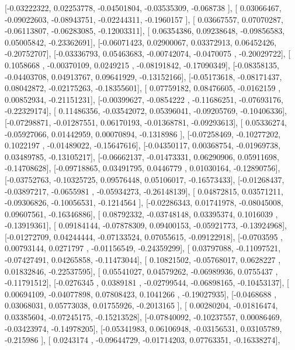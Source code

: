 \documentclass{article}
\begin{document}
       [-0.03222322,  0.02253778, -0.04501804, -0.03535309, -0.068738  ],
       [ 0.03066467, -0.09022603, -0.08943751, -0.02244311, -0.1960157 ],
       [ 0.03667557,  0.07070287, -0.06113807, -0.06283085, -0.12003311],
       [ 0.06354386,  0.09238648, -0.09856583,  0.05005842, -0.23362691],
       [-0.06071423,  0.02900067,  0.03372913,  0.06452426, -0.20752707],
       [-0.03336793,  0.05463683, -0.00742074, -0.0470075 , -0.20029722],
       [ 0.1058668 , -0.00370109,  0.0249215 , -0.08191842, -0.17090349],
       [-0.08358135, -0.04403708,  0.04913767,  0.09641929, -0.13152166],
       [-0.05173618, -0.08171437,  0.08042872, -0.02175263, -0.18355601],
       [ 0.07759182,  0.08476605, -0.0162159 ,  0.00852934, -0.21151231],
       [-0.00399627, -0.0854222 , -0.11686251, -0.07693176, -0.22329174],
       [ 0.11486356, -0.03542072,  0.05396041, -0.09205769, -0.10406336],
       [-0.07298871, -0.01287551,  0.06170193, -0.01368781, -0.09293613],
       [ 0.05336274, -0.05927066,  0.01442959,  0.00070894, -0.1318986 ],
       [-0.07258469, -0.10277202,  0.1022197 , -0.01489022, -0.15647616],
       [-0.04350117,  0.00368754, -0.01969738,  0.03489785, -0.13105217],
       [-0.06662137, -0.01473331,  0.06290906,  0.05911698, -0.14708628],
       [-0.09718865,  0.03491795,  0.0446779 ,  0.01030164, -0.12890756],
       [-0.03752763, -0.10325725,  0.09576448,  0.05106017, -0.16573433],
       [-0.01268437, -0.03897217, -0.0655981 , -0.05934273, -0.26148139],
       [ 0.04872815,  0.03571211, -0.09306826, -0.10056531, -0.1214564 ],
       [-0.02286343,  0.01741978, -0.08045008,  0.09607561, -0.16346886],
       [ 0.08792332, -0.03748148,  0.03395374,  0.1016039 , -0.13919361],
       [ 0.09184144, -0.07878309,  0.09400153, -0.05921773, -0.13924968],
       [-0.01272709,  0.04244444, -0.07133524,  0.07055615, -0.09122918],
       [-0.0703595 ,  0.00793144,  0.0271797 , -0.01156549, -0.24359299],
       [ 0.03797088, -0.11097521, -0.07427491,  0.04265858, -0.11473044],
       [ 0.10821502, -0.05768017,  0.0628227 ,  0.01832846, -0.22537595],
       [ 0.05541027,  0.04579262, -0.06989936,  0.0755437 , -0.11791512],
       [-0.0276345 ,  0.0389181 , -0.02799544, -0.06898165, -0.10453137],
       [ 0.00694109, -0.04077898,  0.07808423,  0.1041266 , -0.19027935],
       [-0.0468688 ,  0.03068031,  0.05773038,  0.01755926, -0.2013165 ],
       [ 0.00280204, -0.01816474,  0.03385604, -0.07245175, -0.15213528],
       [-0.07840092, -0.10237557,  0.00086469, -0.03423974, -0.14978205],
       [-0.05341983,  0.06106948, -0.03156531,  0.03105789, -0.215986  ],
       [ 0.0243174 , -0.09644729, -0.01714203,  0.07763351, -0.16338274],
\end{document}
